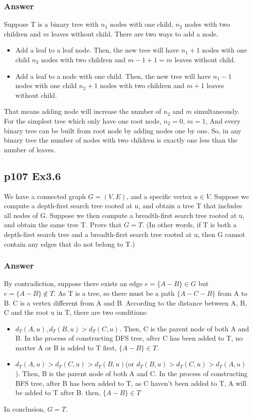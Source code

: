 \documentclass[a4paper]{article}
\begin{document}
\subsubsection*{Answer}
Suppose T is a binary tree with $n_1$ nodes with one child, $n_2$ nodes with two children and $m$ leaves without child. There are two ways to add a node.
\begin{itemize}
	\item Add a leaf to a leaf node. Then, the new tree will have $n_1+1$ nodes with one child $n_2$ nodes with two children and $m-1+1 = m$ leaves without child.
	\item Add a leaf to a node with one child. Then, the new tree will have $n_1-1$ nodes with one child $n_2+1$ nodes with two children and $m+1$ leaves without child.
\end{itemize}
\par That means adding node will increase the number of $n_2$ and $m$ simultaneously. For the simplest tree which only have one root node, $n_2 = 0$, $m = 1$, And every binary tree can be built from root node by adding nodes one by one. So, in any binary tree the number of nodes with two
children is exactly one less than the number of leaves.
\vspace{2cm}

\subsection*{p107 Ex3.6}
\begin{adjustwidth}{1cm}{1cm}
	We have a connected graph $G = (V, E)$, and a specific vertex $u \in V$. Suppose
	we compute a depth-first search tree rooted at u, and obtain a tree T that
	includes all nodes of G. Suppose we then compute a breadth-first search
	tree rooted at u, and obtain the same tree T. Prove that $G = T$. (In other
	words, if T is both a depth-first search tree and a breadth-first search
	tree rooted at u, then G cannot contain any edges that do not belong to
	T.)
\end{adjustwidth}

\subsubsection*{Answer}
By contradiction, suppose there exists an edge $e=\{A-B\} \in G$ but $e=\{A-B\}\notin T$. As T is a tree, so there must be a path $\{A-C-B\}$ from A to B. C is a vertex different from A and B. According to the distance between A, B, C and the root u in T, there are two conditions:
\begin{itemize}
	\item $d_T(A,u),d_T(B,u) > d_T(C,u) $. Then, C is the parent node of both A and B. In the process of constructing DFS tree, after C has been added to T, no matter A or B is added to T first, $\{A-B\}\in T$.
	\item $d_T(A,u) > d_T(C,u) > d_T(B,u)$(or  $d_T(B,u) > d_T(C,u) > d_T(A,u)$). Then, B is the parent node of both A and C. In the process of constructing BFS tree, after B has been added to T, as C haven't been added to T, A will be added to T after B. then, $\{A-B\}\in T$
\end{itemize}
\par In conclusion, $G = T$.
\end{document}
